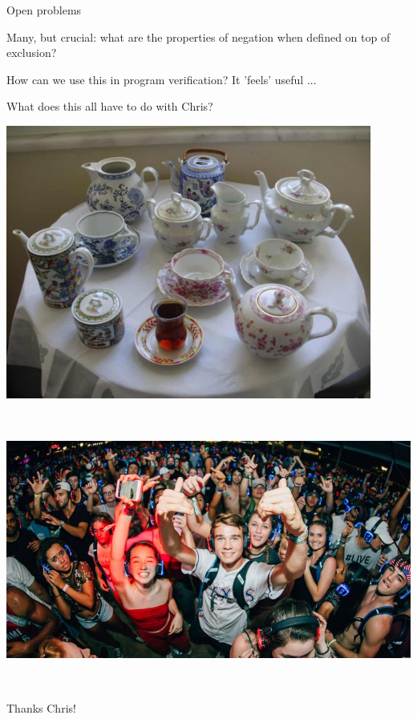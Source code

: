 \begin{frame}{Open problems}

  Many, but crucial: what are the properties of negation when defined
  on top of exclusion?

  \VSPACE\pause

  How can we use this in program verification? It 'feels' useful ...
  
\end{frame}

\begin{frame}
What does this all have to do with Chris?
\end{frame}

\begin{frame}
\includegraphics[height=9cm]{images/tea.jpeg}
\end{frame}

\begin{frame}
\includegraphics[height=9cm]{images/rave.jpg}
\end{frame}

\begin{frame}
Thanks Chris!
\end{frame}




